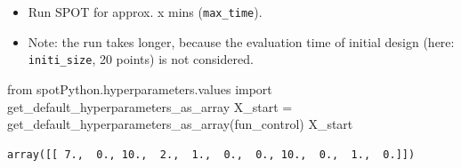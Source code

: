 \documentclass[
  letterpaper,
  DIV=11,
  numbers=noendperiod]{scrreprt}
\newenvironment{Shaded}{\begin{snugshade}}{\end{snugshade}}
\newcommand{\ImportTok}[1]{\textcolor[rgb]{0.00,0.46,0.62}{#1}}
\newcommand{\NormalTok}[1]{\textcolor[rgb]{0.00,0.23,0.31}{#1}}
\newcommand{\OperatorTok}[1]{\textcolor[rgb]{0.37,0.37,0.37}{#1}}
\providecommand{\tightlist}{%
  \setlength{\itemsep}{0pt}\setlength{\parskip}{0pt}}\usepackage{longtable,booktabs,array}
\begin{document}
\begin{itemize}
\tightlist
\item
  Run SPOT for approx. x mins (\texttt{max\_time}).
\item
  Note: the run takes longer, because the evaluation time of initial
  design (here: \texttt{initi\_size}, 20 points) is not considered.
\end{itemize}

\begin{Shaded}
\begin{Highlighting}[]
\ImportTok{from}\NormalTok{ spotPython.hyperparameters.values }\ImportTok{import}\NormalTok{ get\_default\_hyperparameters\_as\_array}
\NormalTok{X\_start }\OperatorTok{=}\NormalTok{ get\_default\_hyperparameters\_as\_array(fun\_control)}
\NormalTok{X\_start}
\end{Highlighting}
\end{Shaded}

\begin{verbatim}
array([[ 7.,  0., 10.,  2.,  1.,  0.,  0., 10.,  0.,  1.,  0.]])
\end{verbatim}
\end{document}
